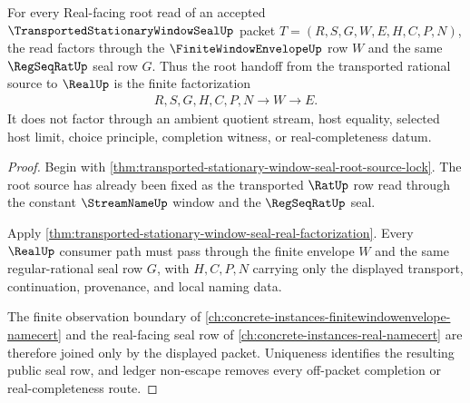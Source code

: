 \begin{theorem}
\label{thm:transported-stationary-window-seal-root-real-factorization}
For every Real-facing root read of an accepted $\TransportedStationaryWindowSealUp$ packet $T=(R,S,G,W,E,H,C,P,N)$, the read factors through the $\FiniteWindowEnvelopeUp$ row $W$ and the same $\RegSeqRatUp$ seal row $G$. Thus the root handoff from the transported rational source to $\RealUp$ is the finite factorization
$$
\begin{aligned}
  R,S,G,H,C,P,N
  \longrightarrow W
  \longrightarrow E .
\end{aligned}
$$
It does not factor through an ambient quotient stream, host equality, selected host limit, choice principle, completion witness, or real-completeness datum.
\end{theorem}
\begin{proof}
Begin with \autoref{thm:transported-stationary-window-seal-root-source-lock}. The root source has already been fixed as the transported $\RatUp$ row read through the constant $\StreamNameUp$ window and the $\RegSeqRatUp$ seal.

Apply \autoref{thm:transported-stationary-window-seal-real-factorization}. Every $\RealUp$ consumer path must pass through the finite envelope $W$ and the same regular-rational seal row $G$, with $H,C,P,N$ carrying only the displayed transport, continuation, provenance, and local naming data.

The finite observation boundary of \autoref{ch:concrete-instances-finitewindowenvelope-namecert} and the real-facing seal row of \autoref{ch:concrete-instances-real-namecert} are therefore joined only by the displayed packet. Uniqueness identifies the resulting public seal row, and ledger non-escape removes every off-packet completion or real-completeness route.
\end{proof}

